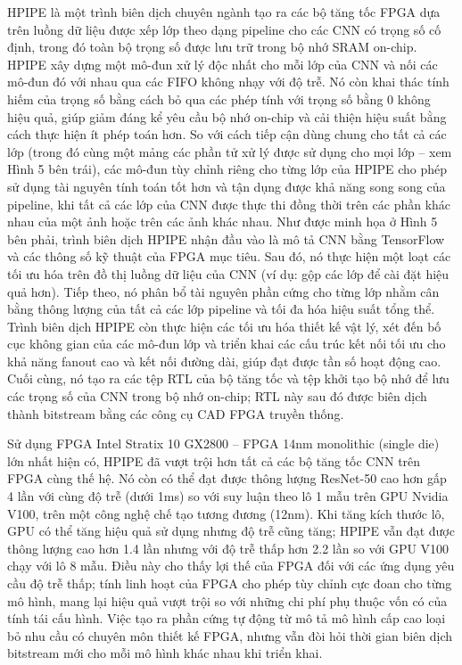 \documentclass[a4paper]{article}
\begin{document}
HPIPE là một trình biên dịch chuyên ngành tạo ra các bộ tăng tốc FPGA dựa trên luồng dữ liệu được xếp lớp theo dạng pipeline cho các CNN có trọng số cố định, trong đó toàn bộ trọng số được lưu trữ trong bộ nhớ SRAM on-chip. HPIPE xây dựng một mô-đun xử lý độc nhất cho mỗi lớp của CNN và nối các mô-đun đó với nhau qua các FIFO không nhạy với độ trễ. Nó còn khai thác tính hiếm của trọng số bằng cách bỏ qua các phép tính với trọng số bằng 0 không hiệu quả, giúp giảm đáng kể yêu cầu bộ nhớ on-chip và cải thiện hiệu suất bằng cách thực hiện ít phép toán hơn. So với cách tiếp cận dùng chung cho tất cả các lớp (trong đó cùng một mảng các phần tử xử lý được sử dụng cho mọi lớp – xem Hình 5 bên trái), các mô-đun tùy chỉnh riêng cho từng lớp của HPIPE cho phép sử dụng tài nguyên tính toán tốt hơn và tận dụng được khả năng song song của pipeline, khi tất cả các lớp của CNN được thực thi đồng thời trên các phần khác nhau của một ảnh hoặc trên các ảnh khác nhau. Như được minh họa ở Hình 5 bên phải, trình biên dịch HPIPE nhận đầu vào là mô tả CNN bằng TensorFlow và các thông số kỹ thuật của FPGA mục tiêu. Sau đó, nó thực hiện một loạt các tối ưu hóa trên đồ thị luồng dữ liệu của CNN (ví dụ: gộp các lớp để cài đặt hiệu quả hơn). Tiếp theo, nó phân bổ tài nguyên phần cứng cho từng lớp nhằm cân bằng thông lượng của tất cả các lớp pipeline và tối đa hóa hiệu suất tổng thể. Trình biên dịch HPIPE còn thực hiện các tối ưu hóa thiết kế vật lý, xét đến bố cục không gian của các mô-đun lớp và triển khai các cấu trúc kết nối tối ưu cho khả năng fanout cao và kết nối đường dài, giúp đạt được tần số hoạt động cao. Cuối cùng, nó tạo ra các tệp RTL của bộ tăng tốc và tệp khởi tạo bộ nhớ để lưu các trọng số của CNN trong bộ nhớ on-chip; RTL này sau đó được biên dịch thành bitstream bằng các công cụ CAD FPGA truyền thống.

Sử dụng FPGA Intel Stratix 10 GX2800 – FPGA 14nm monolithic (single die) lớn nhất hiện có, HPIPE đã vượt trội hơn tất cả các bộ tăng tốc CNN trên FPGA cùng thế hệ. Nó còn có thể đạt được thông lượng ResNet-50 cao hơn gấp 4 lần với cùng độ trễ (dưới 1ms) so với suy luận theo lô 1 mẫu trên GPU Nvidia V100, trên một công nghệ chế tạo tương đương (12nm). Khi tăng kích thước lô, GPU có thể tăng hiệu quả sử dụng nhưng độ trễ cũng tăng; HPIPE vẫn đạt được thông lượng cao hơn 1.4 lần nhưng với độ trễ thấp hơn 2.2 lần so với GPU V100 chạy với lô 8 mẫu. Điều này cho thấy lợi thế của FPGA đối với các ứng dụng yêu cầu độ trễ thấp; tính linh hoạt của FPGA cho phép tùy chỉnh cực đoan cho từng mô hình, mang lại hiệu quả vượt trội so với những chi phí phụ thuộc vốn có của tính tái cấu hình. Việc tạo ra phần cứng tự động từ mô tả mô hình cấp cao loại bỏ nhu cầu có chuyên môn thiết kế FPGA, nhưng vẫn đòi hỏi thời gian biên dịch bitstream mới cho mỗi mô hình khác nhau khi triển khai.
\end{document}
